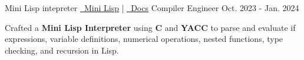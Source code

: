 
            
        \resumeSubheading
            {Mini Lisp intepreter} 
            {
                \href{https://github.com/1chooo/compiler-101/tree/main/mini-lisp-interpreter}{\underline{\faGithub\ Mini Lisp}} 
                |
                \href{https://github.com/1chooo/compiler-101/tree/main/mini-lisp-interpreter}{\underline{{\faDesktop}\ Docs}} 
            } %
            {Compiler Engineer} %
            {Oct. 2023 - Jan. 2024} %
            
            \vspace{-1.0mm}
            
            \resumeItemListStart
                \item {Crafted a \textbf{Mini Lisp Interpreter} using \textbf{C} and \textbf{YACC} to parse and evaluate if expressions, variable definitions, numerical operations, nested functions, type checking, and recursion in Lisp.}
            \resumeItemListEnd
            
            
        
